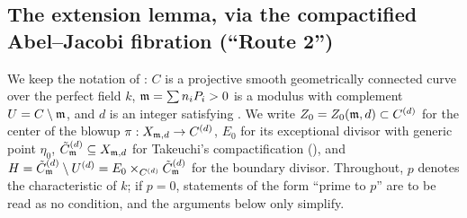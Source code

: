 %
%
%

\subsection*{The extension lemma, via the compactified Abel--Jacobi fibration (``Route 2'')}

We keep the notation of :
$C$ is a projective smooth geometrically connected curve over the perfect field $k$,
$\mathfrak{m} = \sum n_i P_i > 0$ is a modulus with complement $U = C \setminus \mathfrak{m}$,
and $d$ is an integer satisfying .
We write $Z_0 = Z_0(\mathfrak{m}, d) \subset C^{(d)}$ for the center of the blowup
$\pi : X_{\mathfrak{m}, d} \to C^{(d)}$, $E_0$ for its exceptional divisor with generic point $\eta_0$,
$\tilde{C}_{\mathfrak{m}}^{(d)} \subseteq X_{\mathfrak{m},d}$ for Takeuchi's compactification
(), and
$H = \tilde{C}_{\mathfrak{m}}^{(d)} \setminus U^{(d)} = E_0 \times_{C^{(d)}} \tilde{C}_{\mathfrak{m}}^{(d)}$ for the boundary divisor.
Throughout, $p$ denotes the characteristic of $k$; if $p = 0$, statements of the form
``prime to $p$'' are to be read as no condition, and the arguments below only simplify.


